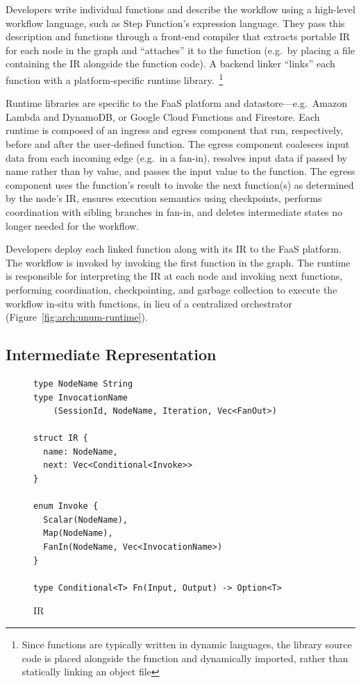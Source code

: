 Developers write individual functions and describe the workflow using a
high-level workflow language, such as Step Function's expression language. They
pass this description and functions through a front-end \name{} compiler that
extracts portable \name{} IR for each node in the graph and ``attaches'' it to
the function (e.g.\ by placing a file containing the IR alongside the function
code). A backend \name{} linker ``links'' each function with a
platform-specific \name{} runtime library.~\footnote{Since functions are
typically written in dynamic languages, the \name{} library source code is
placed alongside the function and dynamically imported, rather than statically
linking an object file}

Runtime libraries are specific to the FaaS platform and datastore---e.g.\ Amazon
Lambda and DynamoDB, or Google Cloud Functions and Firestore. Each runtime is
composed of an ingress and egress component that run, respectively, before and
after the user-defined function. The egress component coalesces input data from
each incoming edge (e.g.\ in a fan-in), resolves input data if passed by name
rather than by value, and passes the input value to the function. The egress
component uses the function's result to invoke the next function(s) as
determined by the node's IR, ensures execution semantics using checkpoints,
performs coordination with sibling branches in fan-in, and deletes intermediate
states no longer needed for the workflow.

Developers deploy each linked function along with its IR to the FaaS platform.
The workflow is invoked by invoking the first function in the graph.  The
\name{} runtime is responsible for interpreting the \name{} IR at each node and
invoking next functions, performing coordination, checkpointing, and garbage
collection to execute the workflow in-situ with functions, in lieu of a
centralized orchestrator (Figure~\ref{fig:arch:unum-runtime}).

\subsection{\name{} Intermediate Representation}\label{sec:design:ir}


\begin{figure}[t!]
    \centering
    \begin{verbatim}
type NodeName String
type InvocationName
    (SessionId, NodeName, Iteration, Vec<FanOut>)

struct IR {
  name: NodeName,
  next: Vec<Conditional<Invoke>>
}

enum Invoke {
  Scalar(NodeName),
  Map(NodeName),
  FanIn(NodeName, Vec<InvocationName>)
}

type Conditional<T> Fn(Input, Output) -> Option<T>
    \end{verbatim}
    \caption{\name{} IR}
    \label{fig:irschema}
\end{figure}


